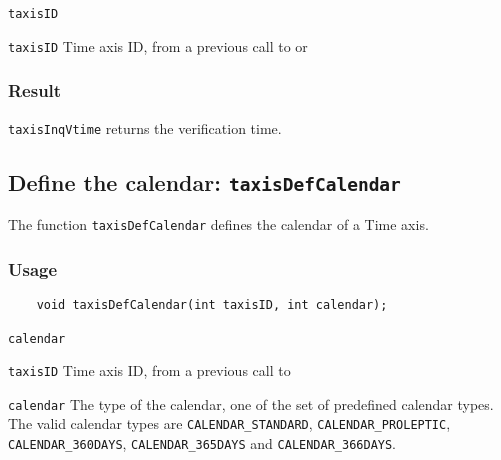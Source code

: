 \hspace*{4mm}\begin{minipage}[]{15cm}
\begin{deflist}{\texttt{taxisID}\ }
\item[\texttt{taxisID}]
Time axis ID, from a previous call to {} or {}

\end{deflist}
\end{minipage}

\subsubsection*{Result}

{\texttt{taxisInqVtime}} returns the verification time.



\subsection{Define the calendar: \texttt{taxisDefCalendar}}
\label{taxisDefCalendar}

The function {\texttt{taxisDefCalendar}} defines the calendar of a Time axis.

\subsubsection*{Usage}

\begin{verbatim}
    void taxisDefCalendar(int taxisID, int calendar);
\end{verbatim}

\hspace*{4mm}\begin{minipage}[]{15cm}
\begin{deflist}{\texttt{calendar}\ }
\item[\texttt{taxisID}]
Time axis ID, from a previous call to {}
\item[\texttt{calendar}]
The type of the calendar, one of the set of predefined {\CDI} calendar types.
                    The valid {\CDI} calendar types are {\texttt{CALENDAR\_STANDARD}}, {\texttt{CALENDAR\_PROLEPTIC}},
                    {\texttt{CALENDAR\_360DAYS}}, {\texttt{CALENDAR\_365DAYS}} and {\texttt{CALENDAR\_366DAYS}}.

\end{deflist}
\end{minipage}


